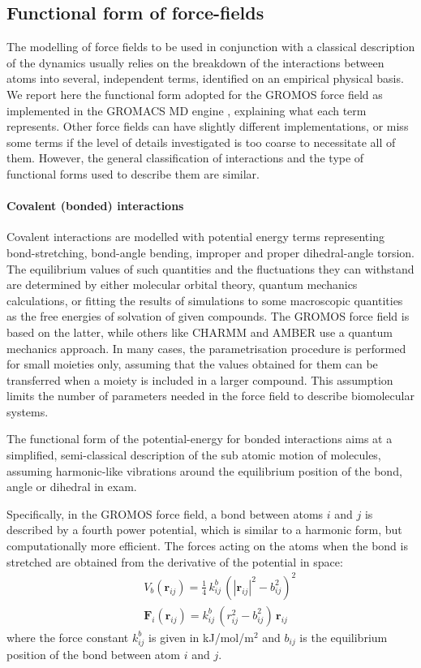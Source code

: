 \subsection{Functional form of force-fields} \label{sec:ff}

The modelling of force fields to be used in conjunction with a classical description of the dynamics usually relies on the breakdown of the interactions between atoms into several, independent terms, identified on an empirical physical basis. We report here the functional form adopted for the GROMOS force field \cite{Oostenbrink2004,Schmid2011} as implemented in the GROMACS MD engine \cite{Berendsen1995,Abraham2015}, explaining what each term represents. Other force fields can have slightly different implementations, or miss some terms if the level of details investigated is too coarse to necessitate all of them. However, the general classification of interactions and the type of functional forms used to describe them are similar.

\paragraph{Covalent (bonded) interactions} Covalent interactions are modelled with potential energy terms representing bond-stretching, bond-angle bending, improper and proper dihedral-angle torsion. The equilibrium values of such quantities and the fluctuations they can withstand are determined by either molecular orbital theory, quantum mechanics calculations, or fitting the results of simulations to some macroscopic quantities as the free energies of solvation of given compounds. The GROMOS force field is based on the latter, while others like CHARMM \cite{MacKerell1998,Klauda2010} and AMBER \cite{Maier2015} use a quantum mechanics approach.
%
In many cases, the parametrisation procedure is performed for small moieties only, assuming that the values obtained for them can be transferred when a moiety is included in a larger compound. This assumption limits the number of parameters needed in the force field to describe biomolecular systems.

The functional form of the potential-energy for bonded interactions aims at a simplified, semi-classical description of the sub atomic motion of molecules, assuming harmonic-like vibrations around the equilibrium position of the bond, angle or dihedral in exam.

Specifically, in the GROMOS force field, a bond between atoms $i$ and $j$ is described by a fourth power potential, which is similar to a harmonic form, but computationally more efficient. The forces acting on the atoms when the bond is stretched are obtained from the derivative of the potential in space:
\begin{eqnarray}
&& V_b(\textbf{r}_{ij}) = \frac{1}{4}\,k^b_{ij}\,\left(|\textbf{r}_{ij}|^2 - b_{ij}^2\right)^2 \\
&& \textbf{F}_i(\textbf{r}_{ij}) = k^b_{ij}\,\left(r_{ij}^2 - b_{ij}^2\right)\,\textbf{r}_{ij}
\end{eqnarray}
where the force constant $k^b_{ij}$ is given in kJ/mol/m$^2$ and $b_{ij}$ is the equilibrium position of the bond between atom $i$ and $j$.

